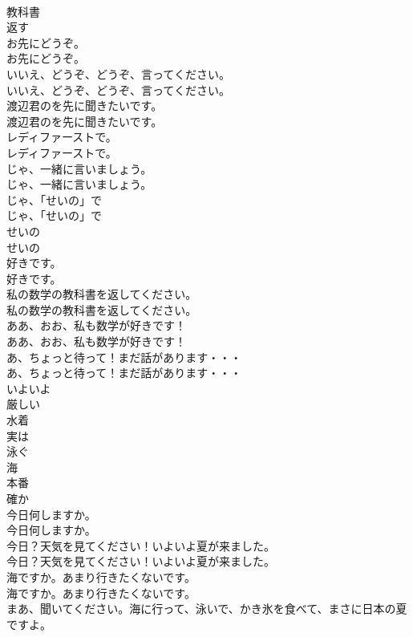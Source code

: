\documentclass[8pt]{extreport}
\begin{document}
\begin{CJK}{UTF8}{min}
\\	教科書
\\	返す
\\	お先にどうぞ。	
\\	お先にどうぞ。 
\\	いいえ、どうぞ、どうぞ、言ってください。	
\\	いいえ、どうぞ、どうぞ、言ってください。 
\\	渡辺君のを先に聞きたいです。	
\\	渡辺君のを先に聞きたいです。 
\\	レディファーストで。	
\\	レディファーストで。 
\\	じゃ、一緒に言いましょう。	
\\	じゃ、一緒に言いましょう。 
\\	じゃ、「せいの」で	
\\	じゃ、「せいの」で 
\\	せいの	
\\	せいの 
\\	好きです。	
\\	好きです。 
\\	私の数学の教科書を返してください。	
\\	私の数学の教科書を返してください。 
\\	ああ、おお、私も数学が好きです！	
\\	ああ、おお、私も数学が好きです！ 
\\	あ、ちょっと待って！まだ話があります・・・	
\\	あ、ちょっと待って！まだ話があります・・・ 
\\	いよいよ
\\	厳しい
\\	水着
\\	実は
\\	泳ぐ
\\	海
\\	本番
\\	確か
\\	今日何しますか。	
\\	今日何しますか。 
\\	今日？天気を見てください！いよいよ夏が来ました。	
\\	今日？天気を見てください！いよいよ夏が来ました。 
\\	海ですか。あまり行きたくないです。	
\\	海ですか。あまり行きたくないです。 
\\	まあ、聞いてください。海に行って、泳いで、かき氷を食べて、まさに日本の夏ですよ。	

\end{CJK}
\end{document}

